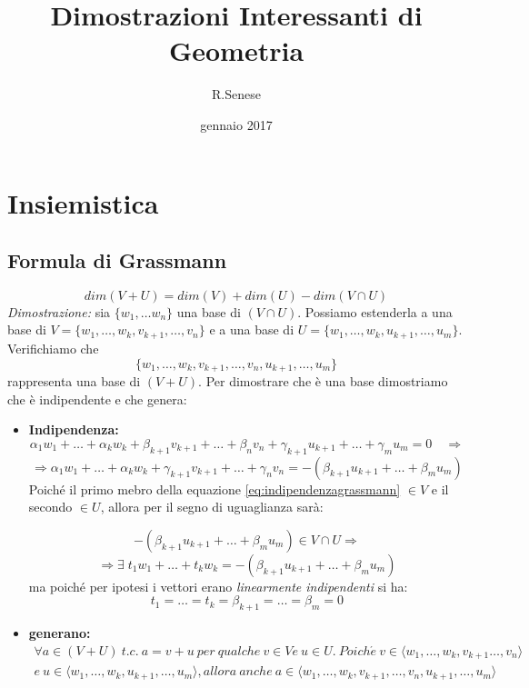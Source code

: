 \documentclass[a4paper]{report}
\title{\textbf{Dimostrazioni Interessanti di Geometria}}
\author{R.Senese}
\date{gennaio 2017}
\begin{document}
		
		\maketitle
		\chapter{Insiemistica}
		\section{\textbf{Formula di Grassmann}}
			\[ dim(V+U) = dim(V) + dim(U) - dim(V \cap U) \] 
			\emph{Dimostrazione:} sia ${\{w_1, \dotsc w_n\}} $ una base di ${(V \cap U)}$. Possiamo estenderla a una base di ${V=\{w_1, \ldots, w_k, v_{k+1}, \ldots, v_n\}}$ e a una base di ${U= \{ w_1, \ldots, w_k, u_{k+1}, \ldots, u_m\}}$. Verifichiamo che \[\Big\{w_1, \ldots, w_k, v_{k+1}, \ldots, v_n, u_{k+1}, \ldots, u_m\Big\} \] rappresenta una base di ${(V+U)}$.
			Per dimostrare che è una base dimostriamo che è indipendente e che genera:
			\begin{itemize}
			\item \textbf{Indipendenza:} 
				\[
				\alpha_1w_1+\ldots+\alpha_kw_k+\beta_{k+1}v_{k+1}+\ldots+\beta_nv_n+\gamma_{k+1}u_{k+1}+\ldots+\gamma_mu_m=0 \quad \Rightarrow
				\]
				\begin{equation}\label{eq:indipendenzagrassmann}
				\Rightarrow \alpha_1w_1+\ldots+\alpha_kw_k+\gamma_{k+1}v_{k+1}+\ldots+\gamma_nv_n=-(\beta_{k+1}u_{k+1}+\ldots+\beta_mu_m)
				\end{equation}
				Poiché il primo mebro della equazione \ref{eq:indipendenzagrassmann} ${\in V}$ e il secondo ${\in U}$, allora per il segno di uguaglianza sarà:
				
				\[ -(\beta_{k+1}u_{k+1}+\ldots+\beta_mu_m) \in V\cap U \Rightarrow \]
				\[ \Rightarrow\exists \; t_1w_1+\ldots+t_kw_k=-(\beta_{k+1}u_{k+1}+\ldots+\beta_mu_m)\]
				ma poiché per ipotesi i vettori erano \emph{linearmente indipendenti} si ha:
				\[ t_1=\ldots=t_k=\beta_{k+1}=\ldots=\beta_m=0\]
			\item\textbf{generano:}
				\begin{equation*}\begin{split}
				\forall a\in(V+U)\ t.c.\ a=v+u\ per \ qualche \ v\in V e\ u\in U. \ Poich\acute{e}\ v\in \big\langle w_1, \ldots, w_k, v_{k+1} \ldots, v_n \big\rangle \\ e \ u\in\big\langle w_1, \ldots, w_k, u_{k+1}, \ldots, u_m \big\rangle, allora\ anche\ a\in\big\langle w_1, \ldots, w_k, v_{k+1}, \ldots, v_n, u_{k+1}, \ldots, u_m \big\rangle
				\end{split}\end{equation*}
			\end{itemize}
			\begin{flushright}
			\Square
			\end{flushright}
			
			
	
\end{document}
